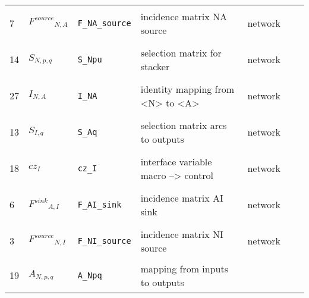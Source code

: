 \begin{longtable}{|p{1cm}|p{2.5cm}|p{4.5cm}|p{8cm}|p{3.0cm}|p{3cm}|p{1cm}|}
            7
             & \hypertarget{"v:7"}{ $ {{F^{source}}}{_{N, A}} $}
             & \verb|F_NA_source|
             & incidence matrix NA source
             & \begin{lay}network \end{lay}
             & $  $
             & \\
            14
             & \hypertarget{"v:14"}{ $ {{S}}{_{N, p, q}} $}
             & \verb|S_Npu|
             & selection matrix for stacker
             & \begin{lay}network \end{lay}
             & $  $
             & \\
            27
             & \hypertarget{"v:27"}{ $ {{I}}{_{N, A}} $}
             & \verb|I_NA|
             & identity mapping from <N> to <A>
             & \begin{lay}network \end{lay}
             & $  $
             & \\
            13
             & \hypertarget{"v:13"}{ $ {{S}}{_{I, q}} $}
             & \verb|S_Aq|
             & selection matrix arcs to outputs
             & \begin{lay}network \end{lay}
             & $  $
             & \\
            18
             & \hypertarget{"v:18"}{ $ {{cz}}{_{I}} $}
             & \verb|cz_I|
             & interface variable macro --> control
             & \begin{lay}network \end{lay}
             & $  $
             & \\
            6
             & \hypertarget{"v:6"}{ $ {{F^{sink}}}{_{A, I}} $}
             & \verb|F_AI_sink|
             & incidence matrix AI sink
             & \begin{lay}network \end{lay}
             & $  $
             & \\
            3
             & \hypertarget{"v:3"}{ $ {{F^{source}}}{_{N, I}} $}
             & \verb|F_NI_source|
             & incidence matrix NI source
             & \begin{lay}network \end{lay}
             & $  $
             & \\
            19
             & \hypertarget{"v:19"}{ $ {{A}}{_{N, p, q}} $}
             & \verb|A_Npq|
             & mapping from inputs to outputs

\end{longtable}
